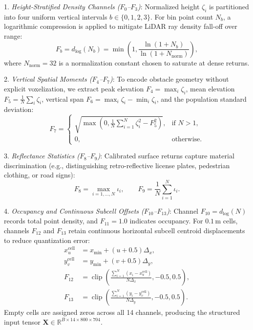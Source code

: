 1. \textit{Height-Stratified Density Channels ($F_0$--$F_3$)}: Normalized height $\zeta_i$ is partitioned into four uniform vertical intervals $b \in \{0, 1, 2, 3\}$. For bin point count $N_b$, a logarithmic compression is applied to mitigate LiDAR ray density fall-off over range:
\begin{equation}
    F_b = d_{\log}(N_b) = \min\left(1, \frac{\ln(1 + N_b)}{\ln(1 + N_{\mathrm{norm}})}\right),
    \label{eq:density_encoding}
\end{equation}
where $N_{\mathrm{norm}} = 32$ is a normalization constant chosen to saturate at dense returns.

2. \textit{Vertical Spatial Moments ($F_4$--$F_7$)}: To encode obstacle geometry without explicit voxelization, we extract peak elevation $F_4 = \max_i \zeta_i$, mean elevation $F_5 = \frac{1}{N}\sum_i \zeta_i$, vertical span $F_6 = \max_i \zeta_i - \min_i \zeta_i$, and the population standard deviation:
\begin{equation}
    F_7 = \begin{cases}
        \sqrt{\max\left(0, \frac{1}{N} \sum_{i=1}^N \zeta_i^2 - F_5^2\right)}, & \text{if } N > 1, \\
        0, & \text{otherwise}.
    \end{cases}
    \label{eq:z_std_encoding}
\end{equation}

3. \textit{Reflectance Statistics ($F_8$--$F_9$)}: Calibrated surface returns capture material discrimination (e.g., distinguishing retro-reflective license plates, pedestrian clothing, or road signs):
\begin{equation}
    F_8 = \max_{i=1,\dots,N} \iota_i, \qquad F_9 = \frac{1}{N} \sum_{i=1}^N \iota_i.
    \label{eq:intensity_encoding}
\end{equation}

4. \textit{Occupancy and Continuous Subcell Offsets ($F_{10}$--$F_{13}$)}: Channel $F_{10} = d_{\log}(N)$ records total point density, and $F_{11} = 1.0$ indicates occupancy. For $0.1$\,m cells, channels $F_{12}$ and $F_{13}$ retain continuous horizontal subcell centroid displacements to reduce quantization error:
\begin{align}
    x_u^{\mathrm{cell}} &= x_{\min} + (u + 0.5)\Delta_x, \nonumber\\
    y_v^{\mathrm{cell}} &= y_{\min} + (v + 0.5)\Delta_y, \nonumber\\
    F_{12} &= \operatorname{clip}\left(\frac{\sum_{i=1}^N (x_i - x_u^{\mathrm{cell}})}{N\Delta_x}, -0.5, 0.5\right), \nonumber\\
    F_{13} &= \operatorname{clip}\left(\frac{\sum_{i=1}^N (y_i - y_v^{\mathrm{cell}})}{N\Delta_y}, -0.5, 0.5\right).
    \label{eq:offset_encoding}
\end{align}
Empty cells are assigned zeros across all 14 channels, producing the structured input tensor $\mathbf{X} \in \mathbb{R}^{B \times 14 \times 800 \times 704}$.

